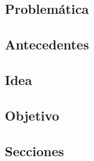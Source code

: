 






\subsection{Problemática}


\subsection{Antecedentes}


\subsection{Idea}


\subsection{Objetivo}


\subsection{Secciones}

